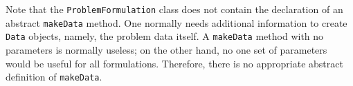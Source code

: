 Note that the \texttt{ProblemFormulation} class does not contain
the declaration of an abstract \texttt{makeData} method. One normally
needs additional information to create \texttt{Data} objects, namely,
the problem data itself. A \texttt{makeData} method with no parameters
is normally useless; on the other hand,  no one set of
parameters would be useful for all formulations. Therefore,
there is no appropriate abstract definition of \texttt{makeData}.

